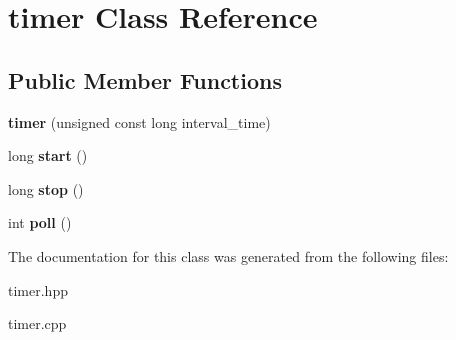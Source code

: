 \hypertarget{classtimer}{}\section{timer Class Reference}
\label{classtimer}
\subsection*{Public Member Functions}
\begin{DoxyCompactItemize}
\item 
{\bfseries timer} (unsigned const long interval\+\_\+time)\hypertarget{classtimer_ac0ab9dc572dcbe33786fa30793ef534e}{}\label{classtimer_ac0ab9dc572dcbe33786fa30793ef534e}

\item 
long {\bfseries start} ()\hypertarget{classtimer_afe213bfd2fef287fa73f1b5e2099f7b8}{}\label{classtimer_afe213bfd2fef287fa73f1b5e2099f7b8}

\item 
long {\bfseries stop} ()\hypertarget{classtimer_a4133abe171e9baa8fb53c0e7eaebdd17}{}\label{classtimer_a4133abe171e9baa8fb53c0e7eaebdd17}

\item 
int {\bfseries poll} ()\hypertarget{classtimer_a1e77d03412e199679fa55c8172ce34de}{}\label{classtimer_a1e77d03412e199679fa55c8172ce34de}

\end{DoxyCompactItemize}


The documentation for this class was generated from the following files\+:\begin{DoxyCompactItemize}
\item 
timer.\+hpp\item 
timer.\+cpp\end{DoxyCompactItemize}
